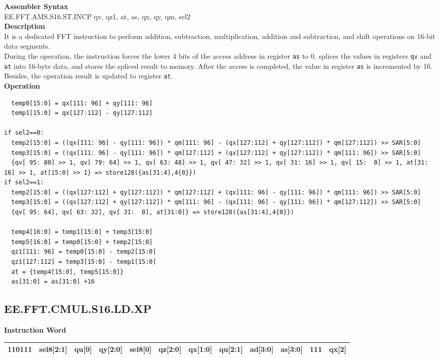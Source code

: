 \textbf{Assembler Syntax} \\
EE.FFT.AMS.S16.ST.INCP qv, qz1, at, as, qx, qy, qm, sel2 \\
\textbf{Description} \\
It is a dedicated FFT instruction to perform addition, subtraction, multiplication, addition and subtraction, and shift operations on 16-bit data segments.\\
During the operation, the instruction forces the lower 4 bits of the access address in register \lstinline{as} to 0, splices the values in registers \lstinline{qv} and \lstinline{at} into 16-byte data, and stores the spliced result to memory. After the access is completed, the value in register \lstinline{as} is incremented by 16. Besides, the operation result is updated to register \lstinline{at}.\\
\textbf{Operation}
\begin{lstlisting}
  temp0[15:0] = qx[111: 96] + qy[111: 96]
  temp1[15:0] = qx[127:112] - qy[127:112]

if sel2==0:
  temp2[15:0] = ((qx[111: 96] - qy[111: 96]) * qm[111: 96] - (qx[127:112] + qy[127:112]) * qm[127:112]) >> SAR[5:0]
  temp3[15:0] = ((qx[111: 96] - qy[111: 96]) * qm[127:112] + (qx[127:112] + qy[127:112]) * qm[111: 96]) >> SAR[5:0]
  {qv[ 95: 80] >> 1, qv[ 79: 64] >> 1, qv[ 63: 48] >> 1, qv[ 47: 32] >> 1, qv[ 31: 16] >> 1, qv[ 15:  0] >> 1, at[31: 16] >> 1, at[15:0] >> 1} => store128({as[31:4],4{0}})
if sel2==1:
  temp2[15:0] = ((qx[127:112] + qy[127:112]) * qm[127:112] + (qx[111: 96] - qy[111: 96]) * qm[111: 96]) >> SAR[5:0]
  temp3[15:0] = ((qx[127:112] + qy[127:112]) * qm[111: 96] - (qx[111: 96] - qy[111: 96]) * qm[127:112]) >> SAR[5:0]
  {qv[ 95: 64], qv[ 63: 32], qv[ 31:  0], at[31:0]} => store128({as[31:4],4{0}})

  temp4[16:0] = temp1[15:0] + temp3[15:0]
  temp5[16:0] = temp0[15:0] + temp2[15:0]
  qz1[111: 96] = temp0[15:0] - temp2[15:0]
  qz1[127:112] = temp3[15:0] - temp1[15:0]
  at = {temp4[15:0], temp5[15:0]}
  as[31:0] = as[31:0] +16
\end{lstlisting}

\clearpage
\subsection{EE.FFT.CMUL.S16.LD.XP}\label{instruction:EEFFTCMULS16LDXP}
\setlength\tabcolsep{6pt}
\textbf{Instruction Word} \\
\begin{tabular}{|c|c|c|c|c|c|c|c|c|c|c|c|}
	\hline
	110111 & sel8[2:1] & qu[0] & qy[2:0] & sel8[0] & qz[2:0] & qx[1:0] & qu[2:1] & ad[3:0] & as[3:0] & 111 & qx[2] \\
	\hline
\end{tabular}

